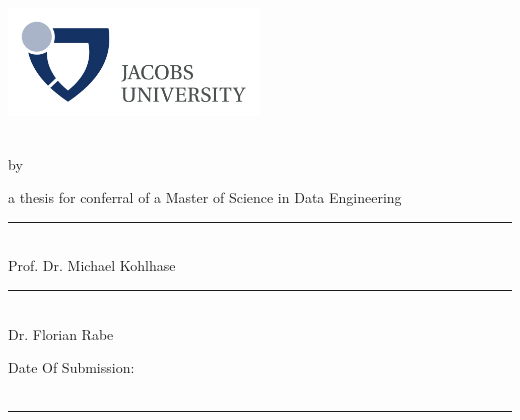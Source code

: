 \makeatletter
\begin{titlepage}
  \thispagestyle{empty}
  
  \providecommand{\HRule}{\vspace{-0.3cm}\rule{.45\linewidth}{0.5mm}}
  \providecommand{\printreviewer}[1]{
    \HRule\\
    \vspace*{-0.4em}
    {\small{#1}}\\[1ex]
  }
  
  
  \vspace*{-3cm}
  \hfill \includegraphics[width=0.5\textwidth]{imgs/jacobs} \\[1cm]
  \vspace*{7mm}  
  
  \begin{center}
    \LARGE {
      \textbf{\@title}\\
      \bigskip
      by\\
      \bigskip
      \textbf{\@author\space}
    }
  \end{center}
  
  
  \vspace*{2.1cm}
  {
    \hspace*{-0.6cm}
    \centerline{
      \large{a thesis for conferral of a Master of Science in Data Engineering}
    }
  }

  \vfill
  
  \Large{
    \begin{flushright}
      \printreviewer{Prof. Dr. Michael Kohlhase}
      \printreviewer{Dr. Florian Rabe}
    \end{flushright}
  }
  
  \vspace{1.5cm}
  
  \begin{flushleft}
    \small{Date Of Submission: {\makeatletter\@date\makeatother}}\\
    \vspace{-0.4cm}
    ~\hrule
  \end{flushleft}
  
\end{titlepage}
\newpage

